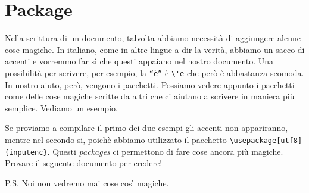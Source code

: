 \section{Package}
Nella scrittura di un documento, talvolta abbiamo necessità di aggiungere 
alcune cose magiche. In italiano, come in altre lingue a dir la verità, 
abbiamo un sacco di accenti e vorremmo far sì che questi appaiano nel nostro 
documento. Una possibilità per scrivere, per esempio, la \texttt{``è''} è 
\verb!\'e! che però è abbastanza scomoda. In nostro aiuto, però, vengono i 
pacchetti. Possiamo vedere appunto i pacchetti come delle cose magiche scritte 
da altri che ci aiutano a scrivere in maniera più semplice. Vediamo un esempio.


Se proviamo a compilare il primo dei due esempi gli accenti non appariranno, 
mentre nel secondo si, poichè abbiamo utilizzato il pacchetto 
\verb!\usepackage[utf8]{inputenc}!. Questi \textit{packages} ci permettono di 
fare cose ancora più magiche. Provare il seguente documento per credere!

P.S. Noi non vedremo mai cose così magiche.